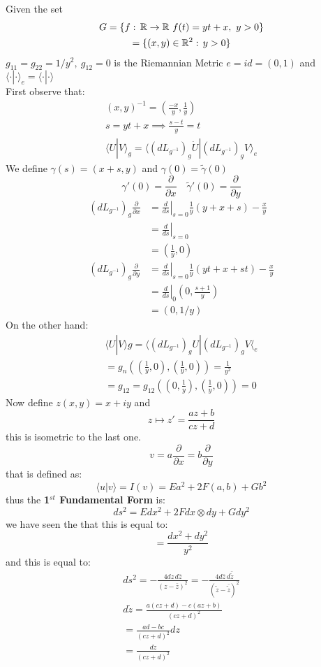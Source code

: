 Given the set 
\begin{gather*}
G=\{ f:\, \mathbb{R}\to \mathbb{R} \ f(t) = yt+x, \ y>0 \}\\
= \{ (x,y)\in \mathbb{R}^2 :\, y>0 \}
\end{gather*}
$g_{11} = g_{22} = 1/y^2,\ g_{12} =0 $ is the Riemannian Metric $e=id = (0,1)$ and $\langle \cdot | \cdot \rangle_e = \langle \cdot | \cdot \rangle$\\
First observe that:
\begin{gather*}
(x,y)^{-1} = \left( \frac{-x}{y}, \frac 1y \right)\\
s=yt + x \implies \frac{s-t}{y} = t\\
\langle U | V \rangle_g = \langle (dL_{g^{-1}})_g \dot U | (dL_{g^{-1}})_g V \rangle_e
\end{gather*}
We define $\gamma(s) = (x+s,y)$ and $\gamma(0) = \tilde \gamma(0)$
$$\gamma'(0) = \frac{\partial}{\partial x} \quad \tilde \gamma'(0) = \frac{\partial}{\partial y}$$
 \begin{align*} 
(dL_{g^{-1}})_g \frac{\partial}{\partial x} &= \left.\frac{d}{ds} \right|_{s=0} \frac 1y (y+x+s) - \frac xy\\
&= \left.\frac{d}{ds} \right|_{s=0}\\
&= \left(\frac 1y, 0 \right)\\
(dL_{g^{-1}})_g \frac{\partial}{\partial y} &= \left.\frac{d}{ds} \right|_{s=0} \frac 1y (yt+x+st) - \frac xy\\
&= \left.\frac{d}{ds} \right|_0 \left( 0, \frac{s+1}{y} \right) \\
&= (0,1/y)
\end{align*} 
On the other hand:
\begin{gather*}
\langle U|V \rangle g = \langle (dL_{g^{-1}})_g U | (dL_{g^{-1}})_g V \langle _e\\
= g_n\left( (\frac 1y ,0), (\frac 1y , 0 ) \right) = \frac{1}{y^2} \\
= g_{12} = g_{12}\left( \left(0,\frac 1y\right), \left(\frac 1y, 0\right) \right) =0
\end{gather*} 
Now define $z(x,y) = x+iy$ and 
$$z \mapsto z' = \frac{az+b}{cz+d}$$
this is isometric to the last one.
$$v= a\frac{\partial}{\partial x} = b\frac{\partial}{\partial y}$$
that is defined as:
$$\langle u| v \rangle = I(v) = E a^2 + 2F(a,b) + Gb^2$$
thus the \textbf{1$^{st}$ Fundamental Form} is:  
$$ds^2 = Edx^2 + 2Fdx \otimes dy + Gdy^2 $$
we have seen the that this is equal to:
$$=\frac{dx^2 + dy^2}{y^2}$$
and this is equal to:
\begin{gather*}
ds^2 = -\frac{4dz\, d\bar z}{(z- \bar z)^2} = -\frac{4d\bar z\, d\bar{\tilde{z}}}{(\tilde z- \bar{\tilde{z}})^2}\\
d\tilde z = \frac{a(cz+d) - c(az+b)}{(cz+d)^2}\\
= \frac{ad-bc}{(cz+d)^2}dz \\
= \frac{dz}{(cz+d)^2}
\end{gather*}
